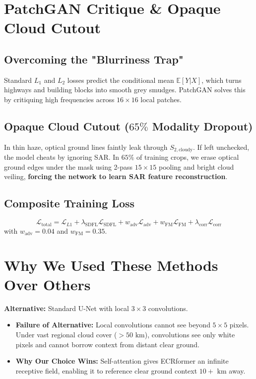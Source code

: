 \documentclass[11pt,a4paper]{article}
\begin{document}
\newpage

\section{PatchGAN Critique \& Opaque Cloud Cutout}

\subsection{Overcoming the "Blurriness Trap"}
Standard $L_1$ and $L_2$ losses predict the conditional mean $\mathbb{E}[Y | X]$, which turns highways and building blocks into smooth grey smudges. PatchGAN solves this by critiquing high frequencies across $16 \times 16$ local patches.

\subsection{Opaque Cloud Cutout ($65\%$ Modality Dropout)}
In thin haze, optical ground lines faintly leak through $S_{2,\text{cloudy}}$. If left unchecked, the model cheats by ignoring SAR. In $65\%$ of training crops, we erase optical ground edges under the mask using 2-pass $15 \times 15$ pooling and bright cloud veiling, \textbf{forcing the network to learn SAR feature reconstruction}.

\subsection{Composite Training Loss}
\begin{equation}
\mathcal{L}_{\text{total}} = \mathcal{L}_{L1} + \lambda_{\text{SDFL}} \mathcal{L}_{\text{SDFL}} + w_{\text{adv}} \mathcal{L}_{\text{adv}} + w_{\text{FM}} \mathcal{L}_{\text{FM}} + \lambda_{\text{corr}} \mathcal{L}_{\text{corr}}
\end{equation}
with $w_{\text{adv}} = 0.04$ and $w_{\text{FM}} = 0.35$.

\section{Why We Used These Methods Over Others}

\begin{tcolorbox}[colback=white,colframe=primary,title=\textbf{1. Why ECRformer over Standard Convolutional U-Nets (e.g. Pix2Pix, DSen2-CR)?}]
\textbf{Alternative:} Standard U-Net with local $3 \times 3$ convolutions.
\begin{itemize}[leftmargin=1.2em, itemsep=0.2em]
    \item \textbf{Failure of Alternative:} Local convolutions cannot see beyond $5 \times 5$ pixels. Under vast regional cloud cover ($>50\text{ km}$), convolutions see only white pixels and cannot borrow context from distant clear ground.
    \item \textbf{Why Our Choice Wins:} Self-attention gives ECRformer an infinite receptive field, enabling it to reference clear ground context $10+\text{ km}$ away.
\end{itemize}
\end{tcolorbox}
\end{document}
